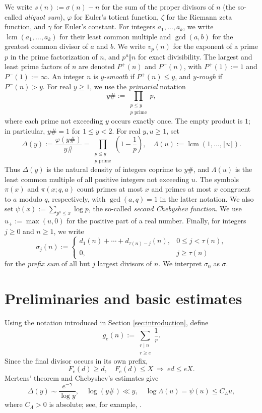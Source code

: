 \documentclass[11pt,letterpaper,reqno]{amsart}
\numberwithin{equation}{section}
\theoremstyle{remark}
\DeclareMathOperator{\lcm}{lcm}
\renewcommand{\leq}{\leqslant}
\renewcommand{\geq}{\geqslant}
\begin{document}
We write $s(n):=\sigma(n)-n$ for the sum of the proper divisors of $n$ (the so-called \emph{aliquot sum}), $\varphi$ for Euler's totient function, $\zeta$ for the Riemann zeta function, and $\gamma$ for Euler's constant.
For integers $a_1,\ldots,a_k$, we write $\lcm(a_1,\ldots,a_k)$ for their least common multiple and $\gcd(a,b)$ for the greatest common divisor of $a$ and $b$.
We write $v_p(n)$ for the exponent of a prime $p$ in the prime factorization of $n$, and
$p^a\Vert n$ for exact divisibility. The largest and least prime factors of $n$ are denoted $P^+(n)$ and $P^-(n)$, with $P^+(1):=1$ and $P^-(1):=\infty$.
An integer $n$ is \emph{$y$-smooth} if $P^+(n)\leq y$, and \emph{$y$-rough} if
$P^-(n)>y$. For real $y\geq1$, we use the \emph{primorial} notation
\[
 y\#:=\prod_{\substack{p\leq y\\p\text{ prime}}}p,
\]
where each prime not exceeding $y$ occurs exactly once. The empty product
is $1$; in particular, $y\#=1$ for $1\leq y<2$. For real $y,u\geq1$, set
\[
 \Delta(y):=\frac{\varphi(y\#)}{y\#}
 =\prod_{\substack{p\leq y\\p\text{ prime}}}\left(1-\frac1p\right),
 \quad
 \Lambda(u):=\lcm(1,\ldots,\lfloor u\rfloor).
\]
Thus $\Delta(y)$ is the natural density of integers coprime to $y\#$,
and $\Lambda(u)$ is the least common multiple of all positive integers
not exceeding $u$.
The symbols $\pi(x)$ and $\pi(x;q,a)$ count primes at most $x$ and
primes at most $x$ congruent to $a$ modulo $q$, respectively, with
$\gcd(a,q)=1$ in the latter notation.
We also set $\psi(x):=\sum_{p^a\leq x}\log p$, the so-called \emph{second Chebyshev function}.
We use $u_+:=\max(u,0)$ for the positive part of a real number.
Finally, for integers $j\geq0$ and $n\geq1$, we write
\[
 \sigma_j(n):=
 \begin{cases}
 d_1(n)+\cdots+d_{\tau(n)-j}(n),&0\leq j<\tau(n),\\
 0,&j\geq\tau(n)
 \end{cases}
\]
for the \emph{prefix sum} of all but $j$ largest divisors of $n$. We interpret $\sigma_0$ as $\sigma$.


\section{Preliminaries and basic estimates}
\label{sec:arithmetic-preliminaries}

Using the notation introduced in Section \ref{sec:introduction}, define
\[
 g_e(n):=\sum_{\substack{r\mid n\\r\geq e}}\frac1r.
\]
Since the final divisor occurs in its own prefix,
\[
 F_e(d)\geq d,\quad F_e(d)\leq X\ \Longrightarrow\ ed\leq eX.
\]
Mertens' theorem and Chebyshev's estimates give
\[
 \Delta(y)\sim\frac{e^{-\gamma}}{\log y},
 \quad \log(y\#)\ll y,
 \quad \log\Lambda(u)=\psi(u)\leq C_\Lambda u,
\]
where $C_\Lambda>0$ is absolute; see, for example, \cite{Tenenbaum}.
\end{document}
